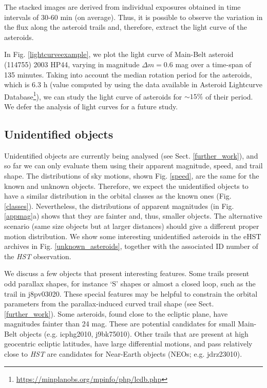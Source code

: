 \documentclass{aa}
\begin{document}
The stacked images are derived from individual exposures obtained in time intervals of 30-60 min (on average). Thus, it is possible to observe the variation in the flux along the asteroid trails and, therefore, extract the light curve of the asteroids.

In Fig. \ref{lightcurveexample}, we plot the light curve of Main-Belt asteroid (114755) 2003 HP44, varying in magnitude $\Delta m=0.6$ mag over a time-span of 135 minutes. Taking into account the median rotation period for the asteroids, which is 6.3 h (value computed by using the data available in  Asteroid Lightcurve Database\footnote{\url{https://minplanobs.org/mpinfo/php/lcdb.php}}), we can study the light curve of asteroids for $\sim15\%$ of their period. We defer the analysis of light curves for a future study.


\subsection{Unidentified objects}

Unidentified objects are currently being analysed (see Sect. \ref{further_work}), and so far we can only evaluate them using their apparent magnitude, speed, and trail shape. The distributions of sky motions, shown Fig. \ref{speed}, are the same for the known and unknown objects. Therefore, we expect the unidentified objects to have a similar distribution in the orbital classes as the known ones (Fig. \ref{classes}). Nevertheless, the distributions of apparent magnitudes (in Fig. \ref{appmag}a) shows that they are fainter and, thus, smaller objects. The alternative scenario (same size objects but at larger distances) should give a different proper motion distribution. We show some interesting unidentified asteroids in the eHST archives in Fig. \ref{unknown_asteroids}, together with the associated ID number of the \textit{HST} observation. 

We discuss a few objects that present interesting features. Some trails present odd parallax shapes, for instance `S' shapes or almost a closed loop, such as the trail in j8pv03020. These special features may be helpful to constrain the orbital parameters from the parallax-induced curved trail shape (see Sect. \ref{further_work}). Some asteroids, found close to the ecliptic plane, have magnitudes fainter than 24 mag. These are potential candidates for small Main-Belt objects (e.g. icphg2010, j9bk75010). Other trails that are present at high geocentric ecliptic latitudes, have large differential motions, and pass relatively close to \textit{HST} are candidates for Near-Earth objects (NEOs; e.g. jdrz23010).
\end{document}
